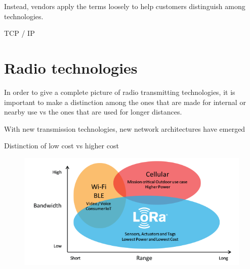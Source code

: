 	Instead, vendors apply the terms loosely to help customers distinguish among technologies.

	TCP / IP

\section{Radio technologies}\label{sec:section_two}
	
	In order to give a complete picture of radio transmitting technologies, it is important to make a distinction among the ones that are made for internal or nearby use vs the ones that are used for longer distances.
	
	
	With new transmission technologies, new network architectures have emerged
	
	
	Distinction of low cost vs higher cost
	
	\begin{figure}
		\centering
		\includegraphics[width=\textwidth]{resources/img/LoRa_Why_Range}
		\caption{}
	\end{figure}
	
